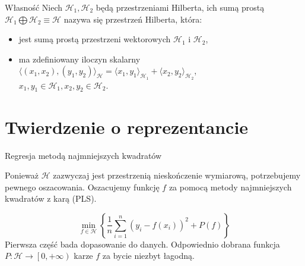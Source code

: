 \documentclass{beamer}
\newcommand{\Hilbert}{\ensuremath{\mathcal{H}}}
\newcommand{\zeroinfty}{\ensuremath{\left[0, +\infty\right)}}
\begin{document}
\begin{frame}
\begin{block}{Własność}
  Niech $\Hilbert_1, \Hilbert_2$ będą przestrzeniami Hilberta, ich sumą prostą  $\Hilbert_1 \bigoplus \Hilbert_2 \equiv \Hilbert$ nazywa się przestrzeń Hilberta, która:
  \begin{itemize}
    \item jest sumą prostą przestrzeni wektorowych $\Hilbert_1$ i $\Hilbert_2$,
    \item ma zdefiniowany iloczyn skalarny \\ 
    \vspace{2mm}
    $\langle (x_1, x_2),(y_1, y_2) \rangle_{\Hilbert} = \langle x_1, y_1 \rangle_{\Hilbert_1} + \langle x_2, y_2 \rangle_{\Hilbert_2}$, \\ 
    \vspace{2mm}
    $x_1, y_1 \in \Hilbert_1, x_2, y_2 \in \Hilbert_2$. \\ 
    \end{itemize}
\end{block}
\end{frame}
 

\section{Twierdzenie o reprezentancie}
\begin{frame}{Regresja metodą najmniejszych kwadratów}

{
Ponieważ $\Hilbert$ zazwyczaj jest przestrzenią nieskończenie wymiarową, potrzebujemy pewnego oszacowania. Oszacujemy funkcję $f$ za pomocą metody najmniejszych kwadratów z karą (PLS).

  \begin{equation} \label{eq:PLS}
    \min_{f \in \Hilbert} \left\{ \dfrac{1}{n}\sum_{i=1}^{n}{(y_i - f(x_i))}^2 +  P(f) \right\}
  \end{equation}
  Pierwsza część bada dopasowanie do danych. Odpowiednio dobrana funkcja $P: \Hilbert  \rightarrow \zeroinfty$ karze $f$ za bycie niezbyt łagodną.
}
\end{frame}
\end{document}
